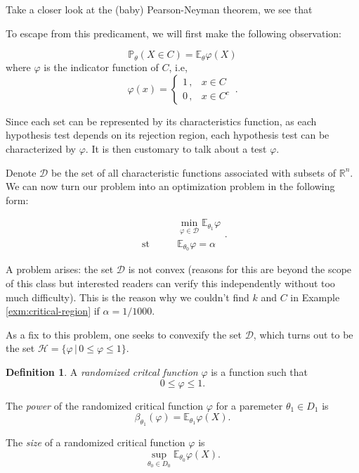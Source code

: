 \documentclass[
  openany]{book}
\theoremstyle{definition}
\newtheorem{definition}{Definition}[chapter]
\theoremstyle{definition}
\theoremstyle{definition}
\theoremstyle{definition}
\theoremstyle{remark}
\begin{document}
Take a closer look at the (baby) Pearson-Neyman theorem, we see that

To escape from this predicament, we will first make the following observation:

\[\mathbb{P}_\theta (X \in C) = \mathbb{E}_\theta \varphi(X)\]
where \(\varphi\) is the indicator function of \(C\), i.e,
\[\varphi (x) = \begin{cases} 1 \,, & x \in C \\ 0 \,, & x \in C^c\end{cases} \,.\]

Since each set can be represented by its characteristics function, as
each hypothesis test depends on its rejection region, each hypothesis test
can be characterized by \(\varphi\).
It is then customary to talk about a test \(\varphi\).

Denote \(\mathcal{D}\) be the set of all characteristic functions associated with
subsets of \(\mathbb{R}^n\).
We can now turn our problem into an optimization problem in the following form:

\[\begin{aligned} & \min_{\varphi \in \mathcal{D}} \mathbb{E}_{\theta_1} \varphi \\
 \text{st} \qquad &  \mathbb{E}_{\theta_0} \varphi = \alpha \end{aligned}. \]

A problem arises: the set \(\mathcal{D}\) is not convex (reasons for this are beyond
the scope of this class but interested readers can verify this independently without
too much difficulty). This is the reason why we couldn't find \(k\) and \(C\) in Example
\ref{exm:critical-region} if \(\alpha=1/1000\).

As a fix to this problem, one seeks to convexify the set \(\mathcal{D}\),
which turns out to be the set
\(\mathcal{H} = \{\varphi \, | \, 0\leq \varphi \leq 1 \}\).

\begin{definition}
A \emph{randomized critcal function} \(\varphi\) is a function such that
\[ 0 \leq \varphi \leq 1. \]

The \emph{power} of the randomized critical function \(\varphi\) for a paremeter \(\theta_1 \in D_1\) is
\[\beta_{\theta_1}(\varphi) = \mathbb{E}_{\theta_1} \varphi(X).\]

The \emph{size} of a randomized critical function \(\varphi\) is
\[ \sup_{\theta_0 \in D_0} \mathbb{E}_{\theta_0} \varphi(X).\]
\end{definition}
\end{document}
